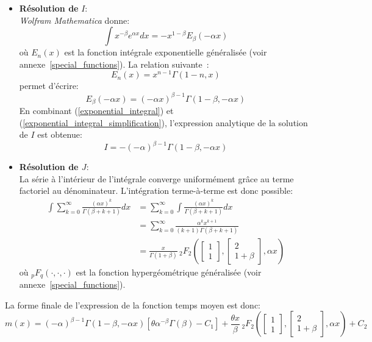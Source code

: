 \begin{itemize}
    \item \textbf{Résolution de} $I$: \\
    \textit{Wolfram Mathematica} donne:
    \begin{equation}\label{exponential_integral}
        \int x^{-\beta}e^{\alpha x}dx = -x^{1-\beta}E_\beta(-\alpha x)
    \end{equation}
    où $E_n(x)$ est la fonction intégrale exponentielle généralisée (voir annexe~\ref{special_functions}).
    La relation suivante~\cite{abramowitz1964}:
    \[
    E_n(x)=x^{n-1}\Gamma(1-n,x)
    \]
    permet d'écrire: 
    \begin{equation}\label{exponential_integral_simplification}
        E_{\beta}(-\alpha x)={(-\alpha x)}^{\beta-1}\Gamma(1-\beta,-\alpha x)
    \end{equation}
    En combinant (\ref{exponential_integral}) et (\ref{exponential_integral_simplification}), l'expression analytique de la solution de $I$ est obtenue:
    \[
        I=-{(-\alpha)}^{\beta-1}\Gamma(1-\beta,-\alpha x)
    \]
    \item \textbf{Résolution de $J$}: \\
    La série à l'intérieur de l'intégrale converge uniformément grâce au terme factoriel au dénominateur. L'intégration terme-à-terme est donc possible: 
    \[
    \begin{aligned}
        \int\sum_{k=0}^{\infty} \frac{{(\alpha x)}^k}{\Gamma(\beta+k+1)}dx &= \sum_{k=0}^{\infty} \int \frac{{(\alpha x)}^k}{\Gamma(\beta+k+1)}dx \\
        &= \sum_{k=0}^{\infty} \frac{\alpha^k x^{k+1}}{(k+1)\Gamma(\beta+k+1)} \\
        &= \frac{x}{\Gamma(1+\beta)}\,_2F_2\left(\begin{bmatrix}1\\1\end{bmatrix},\begin{bmatrix}2\\1+\beta\end{bmatrix},\alpha x\right)
    \end{aligned}
    \]
    où $_p F_q(\cdot,\cdot,\cdot)$ est la fonction hypergéométrique généralisée (voir annexe~\ref{special_functions}).
    
\end{itemize}
La forme finale de l'expression de la fonction temps moyen est donc:
\begin{equation}\label{sol_mean}
    m(x)={(-\alpha)}^{\beta-1}\Gamma(1-\beta,-\alpha x)\left[\theta\alpha^{-\beta}\Gamma(\beta)-C_1\right]+\frac{\theta x}{\beta}\,{}_2F_2\left(\begin{bmatrix}1\\1\end{bmatrix},\begin{bmatrix}2\\1+\beta\end{bmatrix},\alpha x\right) + C_2
\end{equation}

